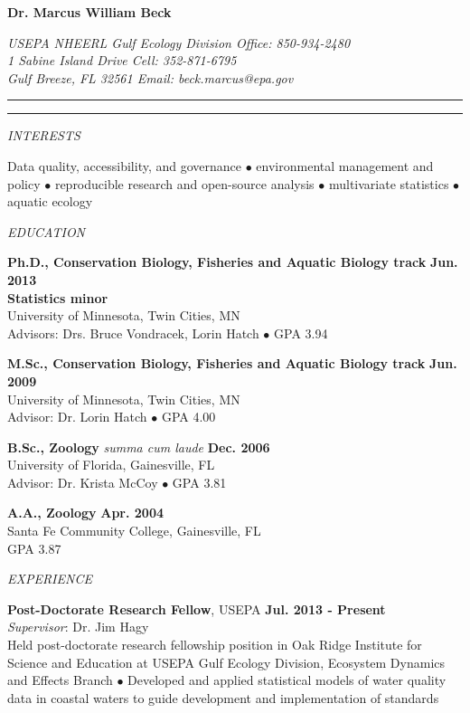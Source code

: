 \documentclass[letterpaper,12pt]{article}
\newcommand{\sectitle}[1]{\vspace{\baselineskip} \centerline{\large{\textit{#1}}}}
\begin{document}
\raggedright

\LARGE
\centerline{{\bf Dr. Marcus William Beck}}
\normalsize
\textit{USEPA NHEERL Gulf Ecology Division \hfill Office: 850-934-2480 \\
1 Sabine Island Drive \hfill Cell: 352-871-6795 \\
Gulf Breeze, FL 32561 \hfill Email: beck.marcus@epa.gov}
\vspace{4pt}
\hrule
\vspace{2pt}
\hrule
\vspace{4pt}

\sectitle{INTERESTS}

Data quality, accessibility, and governance $\bullet$ environmental management and policy $\bullet$ reproducible research and open-source analysis $\bullet$ multivariate statistics $\bullet$ aquatic ecology 

\sectitle{EDUCATION}

{\bf Ph.D., Conservation Biology, Fisheries and Aquatic Biology track} \hfill {\bf Jun. 2013} \\
{\bf Statistics minor} \\
University of Minnesota, Twin Cities, MN \\
Advisors: Drs. Bruce Vondracek, Lorin Hatch $\bullet$ GPA 3.94 

{\bf M.Sc., Conservation Biology, Fisheries and Aquatic Biology track} \hfill {\bf Jun. 2009} \\
University of Minnesota, Twin Cities, MN \\
Advisor: Dr. Lorin Hatch $\bullet$ GPA 4.00

{\bf B.Sc., Zoology} \textit{summa cum laude} \hfill {\bf Dec. 2006} \\
University of Florida, Gainesville, FL \\
Advisor: Dr. Krista McCoy $\bullet$ GPA 3.81

{\bf A.A., Zoology} \hfill {\bf Apr. 2004} \\
Santa Fe Community College, Gainesville, FL \\
GPA 3.87

\sectitle{EXPERIENCE}

{\bf Post-Doctorate Research Fellow}, USEPA \hfill {\bf Jul. 2013 - Present}\\
\textit{Supervisor}: Dr. Jim Hagy \\
Held post-doctorate research fellowship position in Oak Ridge Institute for Science and Education at USEPA Gulf Ecology Division, Ecosystem Dynamics and Effects Branch $\bullet$ Developed and applied statistical models of water quality data in coastal waters to guide development and implementation of standards
\end{document}
